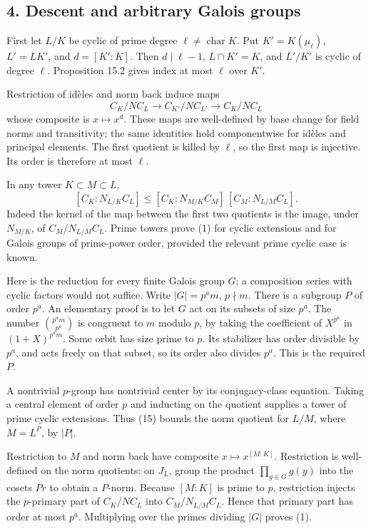 \documentclass[11pt,a4paper]{article}
\begin{document}
\subsection{4. Descent and arbitrary Galois
groups}\label{descent-and-arbitrary-galois-groups}

First let \(L/K\) be cyclic of prime degree
\(\ell\ne\operatorname{char}K\). Put \(K'=K(\mu_\ell)\), \(L'=LK'\), and
\(d=[K':K]\). Then \(d\mid\ell-1\), \(L\cap K'=K\), and \(L'/K'\) is
cyclic of degree \(\ell\). Proposition 15.2 gives index at most \(\ell\)
over \(K'\).

Restriction of idèles and norm back induce maps \[
C_K/NC_L\longrightarrow C_{K'}/NC_{L'}
\longrightarrow C_K/NC_L
\tag{14}
\] whose composite is \(x\mapsto x^d\). These maps are well-defined by
base change for field norms and transitivity; the same identities hold
componentwise for idèles and principal elements. The first quotient is
killed by \(\ell\), so the first map is injective. Its order is
therefore at most \(\ell\).

In any tower \(K\subset M\subset L\), \[
[C_K:N_{L/K}C_L]\leq
[C_K:N_{M/K}C_M]\,[C_M:N_{L/M}C_L].
\tag{15}
\] Indeed the kernel of the map between the first two quotients is the
image, under \(N_{M/K}\), of \(C_M/N_{L/M}C_L\). Prime towers prove (1)
for cyclic extensions and for Galois groups of prime-power order,
provided the relevant prime cyclic case is known.

Here is the reduction for every finite Galois group \(G\); a composition
series with cyclic factors would not suffice. Write \(|G|=p^a m\),
\(p\nmid m\). There is a subgroup \(P\) of order \(p^a\). An elementary
proof is to let \(G\) act on its subsets of size \(p^a\). The number
\(\binom{p^a m}{p^a}\) is congruent to \(m\) modulo \(p\), by taking the
coefficient of \(X^{p^a}\) in \((1+X)^{p^a m}\). Some orbit has size
prime to \(p\). Its stabilizer has order divisible by \(p^a\), and acts
freely on that subset, so its order also divides \(p^a\). This is the
required \(P\).

A nontrivial \(p\)-group has nontrivial center by its conjugacy-class
equation. Taking a central element of order \(p\) and inducting on the
quotient supplies a tower of prime cyclic extensions. Thus (15) bounds
the norm quotient for \(L/M\), where \(M=L^P\), by \(|P|\).

Restriction to \(M\) and norm back have composite
\(x\mapsto x^{[M:K]}\). Restriction is well-defined on the norm
quotients: on \(J_L\), group the product \(\prod_{g\in G}g(y)\) into the
cosets \(Pr\) to obtain a \(P\)-norm. Because \([M:K]\) is prime to
\(p\), restriction injects the \(p\)-primary part of \(C_K/NC_L\) into
\(C_M/N_{L/M}C_L\). Hence that primary part has order at most \(p^a\).
Multiplying over the primes dividing \(|G|\) proves (1).
\end{document}
